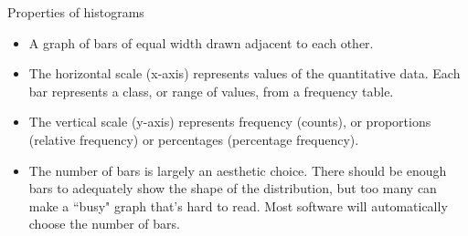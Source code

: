 \documentclass[xcolor=table, aspectratio=169, bigger, handout]{beamer}
\begin{document}
\begin{frame}{Properties of histograms}
\begin{block}{}
\begin{itemize}
\item A graph of bars of equal width drawn adjacent to each other.
\pause
\item The horizontal scale (x-axis) represents values of the quantitative data. Each bar represents a class, or range of values, from a frequency table. 
\pause
\item The vertical scale (y-axis) represents frequency (counts), or proportions (relative frequency) or percentages (percentage frequency).
\pause
\item The number of bars is largely an aesthetic choice. There should be enough bars to adequately show the shape of the distribution, but too many can make a ``busy" graph that's hard to read. Most software will automatically choose the number of bars.
\end{itemize}
\end{block}
\end{frame}
\end{document}
